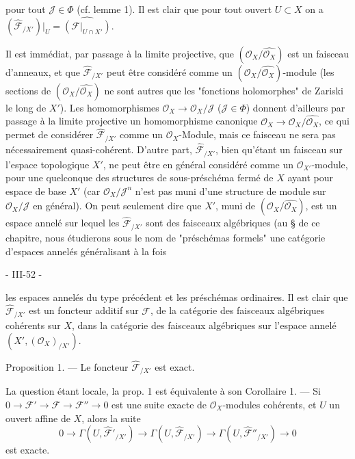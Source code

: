 pour tout $\mathcal{J} \in \Phi$ (cf. lemme 1). Il est clair que pour tout ouvert $U \subset X$ on a $(\widehat{\mathcal{F}}_{/X'})|_U = \widehat{(\mathcal{F}|_{U \cap X'})}$.

Il est immédiat, par passage à la limite projective, que $(\mathcal{O}_X/\widehat{\mathcal{O}_X})$ est un faisceau d'anneaux, et que $\widehat{\mathcal{F}}_{/X'}$ peut être considéré comme un $(\mathcal{O}_X/\widehat{\mathcal{O}_X})$-module (les sections de $(\mathcal{O}_X/\widehat{\mathcal{O}_X})$ ne sont autres que les "fonctions holomorphes" de Zariski le long de $X'$). Les homomorphismes $\mathcal{O}_X \to \mathcal{O}_X/\mathcal{J}$ ($\mathcal{J} \in \Phi$) donnent d'ailleurs par passage à la limite projective un homomorphisme canonique $\mathcal{O}_X \to \mathcal{O}_X/\widehat{\mathcal{O}_X}$, ce qui permet de considérer $\widehat{\mathcal{F}}_{/X'}$ comme un $\mathcal{O}_X$-Module, mais ce faisceau ne sera pas nécessairement quasi-cohérent. D'autre part, $\widehat{\mathcal{F}}_{/X'}$, bien qu'étant un faisceau sur l'espace topologique $X'$, ne peut être en général considéré comme un $\mathcal{O}_{X'}$-module, pour une quelconque des structures de sous-préschéma fermé de $X$ ayant pour espace de base $X'$ (car $\mathcal{O}_X/\mathcal{J}^n$ n'est pas muni d'une structure de module sur $\mathcal{O}_X/\mathcal{J}$ en général). On peut seulement dire que $X'$, muni de $(\mathcal{O}_X/\widehat{\mathcal{O}_X})$, est un espace annelé sur lequel les $\widehat{\mathcal{F}}_{/X'}$ sont des faisceaux algébriques (au § de ce chapitre, nous étudierons sous le nom de "préschémas formels" une catégorie d'espaces annelés généralisant à la fois

\newpage


- III-52 -

les espaces annelés du type précédent et les préschémas ordinaires.
Il est clair que $\widehat{\mathcal{F}}_{/X'}$ est un foncteur additif sur $\mathcal{F}$, de la catégorie des faisceaux algébriques cohérents sur $X$, dans la catégorie des faisceaux algébriques sur l'espace annelé $(X', (\mathcal{O}_X)_{/X'})$.

Proposition 1. — Le foncteur $\widehat{\mathcal{F}}_{/X'}$ est exact.

La question étant locale, la prop. 1 est équivalente à son
Corollaire 1. — Si $0 \to \mathcal{F}' \to \mathcal{F} \to \mathcal{F}'' \to 0$ est une suite exacte de $\mathcal{O}_X$-modules cohérents, et $U$ un ouvert affine de $X$, alors la suite
$$0 \to \Gamma(U, \widehat{\mathcal{F}}'_{/X'}) \to \Gamma(U, \widehat{\mathcal{F}}_{/X'}) \to \Gamma(U, \widehat{\mathcal{F}}''_{/X'}) \to 0$$
est exacte.

